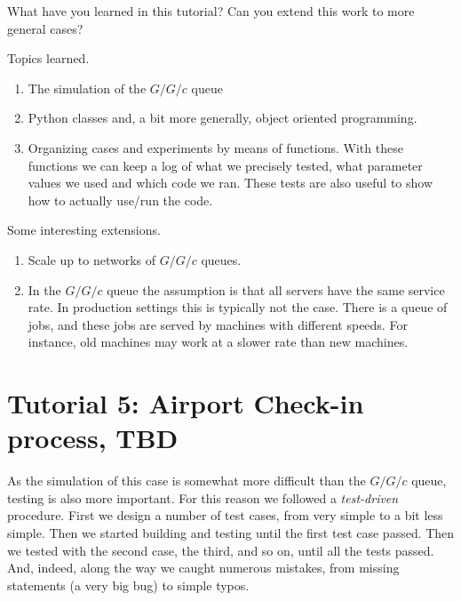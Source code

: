 \begin{exercise}
  What have you learned in this tutorial?
 Can you extend this work to more general cases? 
  \begin{solution}
    Topics learned.
    \begin{enumerate}
    \item The simulation of the $G/G/c$ queue
    \item Python classes and, a bit more generally, object oriented programming. 
    \item Organizing cases and experiments by means of  functions. With these functions we can keep a log of what we precisely tested, what parameter values we used and which code we ran. These tests are also useful to show how to actually use/run the code.
    \end{enumerate}

Some  interesting extensions.
    \begin{enumerate}
    \item   Scale up to networks of $G/G/c$ queues.
    \item In the $G/G/c$ queue the assumption is that all servers have the same service rate.
      In production settings this is typically not the case.
      There is a queue of jobs, and these jobs are served by machines with different speeds.
      For instance, old machines may work at a slower rate than new machines.
    \end{enumerate}
  \end{solution}
\end{exercise}


\clearpage


\section{Tutorial 5: Airport Check-in process, TBD}
\label{sec:simul-check-proc}

As the simulation of this case is somewhat more difficult than the $G/G/c$ queue, testing is also more important. For this reason we followed a \emph{test-driven} procedure. First we design a number of test cases, from very simple to a bit less simple. Then we started building and testing until the first test case passed. Then we tested with the second case, the third, and so on, until all the tests passed. And, indeed, along the way we caught numerous mistakes, from missing  statements (a very big bug) to simple typos.

